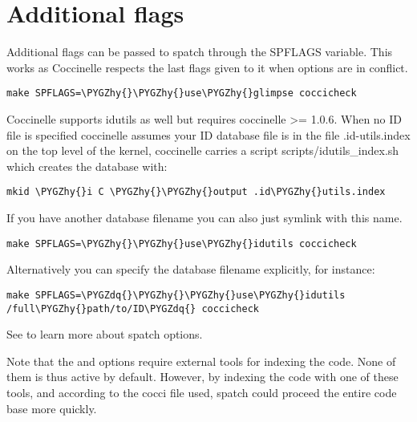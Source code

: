 \documentclass[a4paper,8pt,english]{sphinxmanual}
\def\PYGZhy{\char`\-}
\def\PYGZdq{\char`\"}
\begin{document}
\section{Additional flags}
\label{dev-tools/coccinelle:additional-flags}
Additional flags can be passed to spatch through the SPFLAGS
variable. This works as Coccinelle respects the last flags
given to it when options are in conflict.

\begin{Verbatim}[commandchars=\\\{\}]
make SPFLAGS=\PYGZhy{}\PYGZhy{}use\PYGZhy{}glimpse coccicheck
\end{Verbatim}

Coccinelle supports idutils as well but requires coccinelle \textgreater{}= 1.0.6.
When no ID file is specified coccinelle assumes your ID database file
is in the file .id-utils.index on the top level of the kernel, coccinelle
carries a script scripts/idutils\_index.sh which creates the database with:

\begin{Verbatim}[commandchars=\\\{\}]
mkid \PYGZhy{}i C \PYGZhy{}\PYGZhy{}output .id\PYGZhy{}utils.index
\end{Verbatim}

If you have another database filename you can also just symlink with this
name.

\begin{Verbatim}[commandchars=\\\{\}]
make SPFLAGS=\PYGZhy{}\PYGZhy{}use\PYGZhy{}idutils coccicheck
\end{Verbatim}

Alternatively you can specify the database filename explicitly, for
instance:

\begin{Verbatim}[commandchars=\\\{\}]
make SPFLAGS=\PYGZdq{}\PYGZhy{}\PYGZhy{}use\PYGZhy{}idutils /full\PYGZhy{}path/to/ID\PYGZdq{} coccicheck
\end{Verbatim}

See  to learn more about spatch options.

Note that the  and  options
require external tools for indexing the code. None of them is
thus active by default. However, by indexing the code with
one of these tools, and according to the cocci file used,
spatch could proceed the entire code base more quickly.
\end{document}
